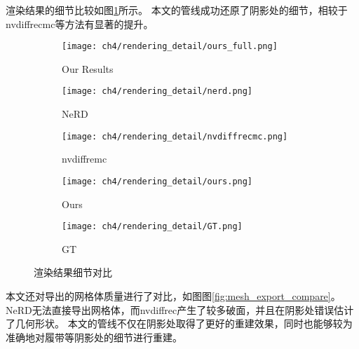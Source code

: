 渲染结果的细节比较如图\ref{fig:rendering_detail_compare}所示。
本文的管线成功还原了阴影处的细节，相较于nvdiffrecmc等方法有显著的提升。

\begin{figure}[H]
  \centering
  \begin{subfigure}[c]{0.32\textwidth}
    \centering
    \texttt{[image: ch4/rendering\_detail/ours\_full.png]}
    \caption{Our Results}
  \end{subfigure}
  \begin{subfigure}[c]{0.16\textwidth}
    \centering
    \texttt{[image: ch4/rendering\_detail/nerd.png]}
    \caption{NeRD}
  \end{subfigure}
  \hspace{0.1mm}
  \begin{subfigure}[c]{0.16\textwidth}
    \centering
    \texttt{[image: ch4/rendering\_detail/nvdiffrecmc.png]}
    \caption{nvdiffremc}
  \end{subfigure}
  \hspace{0.1mm}
  \begin{subfigure}[c]{0.16\textwidth}
    \centering
    \texttt{[image: ch4/rendering\_detail/ours.png]}
    \caption{Ours}
  \end{subfigure}
  \hspace{0.1mm}
  \begin{subfigure}[c]{0.16\textwidth}
    \centering
    \texttt{[image: ch4/rendering\_detail/GT.png]}
    \caption{GT}
  \end{subfigure}
  \caption{渲染结果细节对比}
  \label{fig:rendering_detail_compare}
\end{figure}

本文还对导出的网格体质量进行了对比，如图图\ref{fig:mesh_export_compare}。
NeRD无法直接导出网格体，而nvdiffrec产生了较多破面，并且在阴影处错误估计了几何形状。
本文的管线不仅在阴影处取得了更好的重建效果，同时也能够较为准确地对履带等阴影处的细节进行重建。

